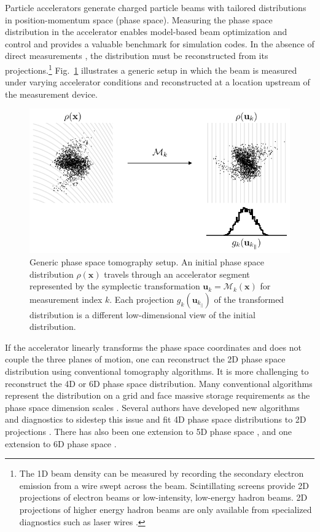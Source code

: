 \documentclass[%
    reprint,
    twocolumn,
    nofootinbib,
    amsmath,
    amssymb,
    aps,
    prstab,
]{revtex4-2}
\newcommand{\vect}[1]{\boldsymbol{\mathbf{#1}}}
\begin{document}
Particle accelerators generate charged particle beams with tailored distributions in position-momentum space (phase space). Measuring the phase space distribution in the accelerator enables model-based beam optimization and control and provides a valuable benchmark for simulation codes. In the absence of direct measurements \cite{Cathey_2018, Ruisard_2020, Hoover_2023}, the distribution must be reconstructed from its projections.\footnote{The 1D beam density can be measured by recording the secondary electron emission from a wire swept across the beam. Scintillating screens provide 2D projections of electron beams or low-intensity, low-energy hadron beams. 2D projections of higher energy hadron beams are only available from specialized diagnostics such as laser wires \cite{Liu_2020}.} Fig.~\ref{fig:diagram} illustrates a generic setup in which the beam is measured under varying accelerator conditions and reconstructed at a location upstream of the measurement device.
%
\begin{figure}
    \centering
    \includegraphics[width=\columnwidth]{fig_diagram.pdf}
    \caption{Generic phase space tomography setup. An initial phase space distribution $\rho(\vect{x})$ travels through an accelerator segment represented by the symplectic transformation $\vect{u}_k = \mathcal{M}_k(\vect{x})$ for measurement index $k$. Each projection $g_k(\vect{u}_{k_\parallel})$ of the transformed distribution is a different low-dimensional view of the initial distribution.}
    \label{fig:diagram}
\end{figure}
%

If the accelerator linearly transforms the phase space coordinates and does not couple the three planes of motion, one can reconstruct the 2D phase space distribution using conventional tomography algorithms. It is more challenging to reconstruct the 4D or 6D phase space distribution. Many conventional algorithms represent the distribution on a grid and face massive storage requirements as the phase space dimension scales \cite{Wolski_2020}. Several authors have developed new algorithms and diagnostics to sidestep this issue and fit 4D phase space distributions to 2D projections \cite{Hock_2013, Wang_2019, Wolski_2020, Marchetti_2021, Wolski_2023, Roussel_2023}. There has also been one extension to 5D phase space \cite{Jaster_2024}, and one extension to 6D phase space \cite{Roussel_2024_6d}.
\end{document}
